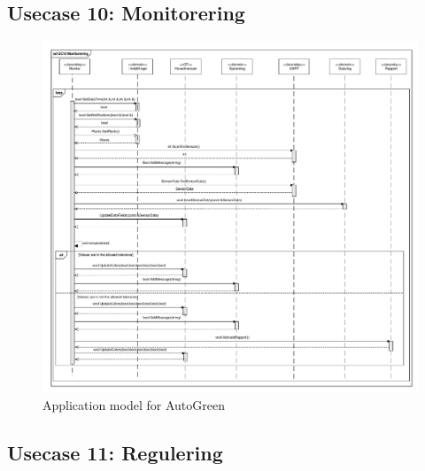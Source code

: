 \clearpage

\subsection{Usecase 10: Monitorering}

\begin{figure}[!h]
\centering 
\includegraphics[width={\textwidth-1cm}, trim=0 0 0 0, clip=true] {../fig/SD_autoGreen_UC_10.pdf}
\caption{Application model for AutoGreen}
\label{fig:SD_UC10}
\end{figure}

\clearpage

\subsection{Usecase 11: Regulering}

